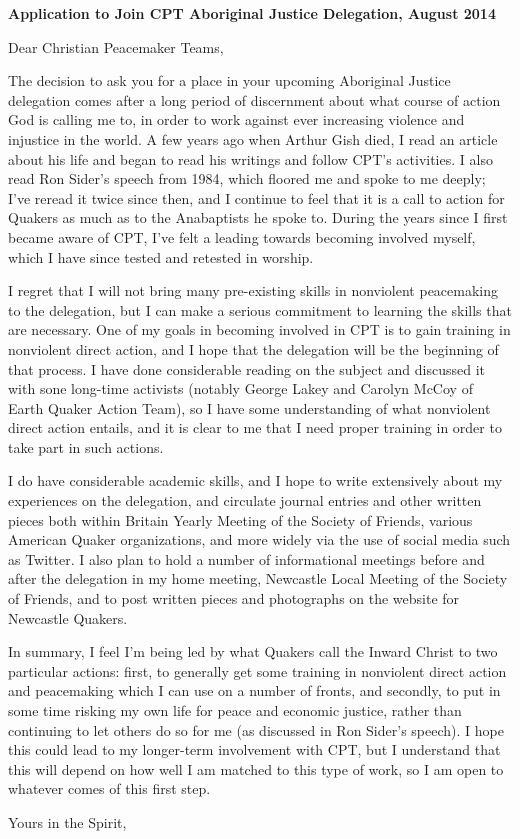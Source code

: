 \documentclass[a4paper,12pt]{letter}
\begin{document}
\begin{letter}{\textbf{Application to Join CPT Aboriginal Justice Delegation, August 2014}}

\opening{Dear Christian Peacemaker Teams,} %

The decision to ask you for a place in your upcoming Aboriginal Justice delegation comes after a long period of discernment about what course of action God is calling me to, in order to work against ever increasing violence and injustice in the world. A few years ago when Arthur Gish died, I read an article about his life and began to read his writings and follow CPT's activities. I also read Ron Sider's speech from 1984, which floored me and spoke to me deeply; I've reread it twice since then, and I continue to feel that it is a call to action for Quakers as much as to the Anabaptists he spoke to. During the years since I first became aware of CPT, I've felt a leading towards becoming involved myself, which I have since tested and retested in worship.

I regret that I will not bring many pre-existing skills in nonviolent peacemaking to the delegation, but I can make a serious commitment to learning the skills that are necessary. One of my goals in becoming involved in CPT is to gain training in nonviolent direct action, and I hope that the delegation will be the beginning of that process. I have done considerable reading on the subject and discussed it with sone long-time activists (notably George Lakey and Carolyn McCoy of Earth Quaker Action Team), so I have some understanding of what nonviolent direct action entails, and it is clear to me that I need proper training in order to take part in such actions.

I do have considerable academic skills, and I hope to write extensively about my experiences on the delegation, and circulate journal entries and other written pieces both within Britain Yearly Meeting of the Society of Friends, various American Quaker organizations, and more widely via the use of social media such as Twitter. I also plan to hold a number of informational meetings before and after the delegation in my home meeting, Newcastle Local Meeting of the Society of Friends, and to post written pieces and photographs on the website for Newcastle Quakers.

In summary, I feel I'm being led by what Quakers call the Inward Christ to two particular actions: first, to generally get some training in nonviolent direct action and peacemaking which I can use on a number of fronts, and secondly, to put in some time risking my own life for peace and economic justice, rather than continuing to let others do so for me (as discussed in Ron Sider's speech). I hope this could lead to my longer-term involvement with CPT, but I understand that this will depend on how well I am matched to this type of work, so I am open to whatever comes of this first step.




\closing{Yours in the Spirit,} %


\end{letter}
\end{document}
